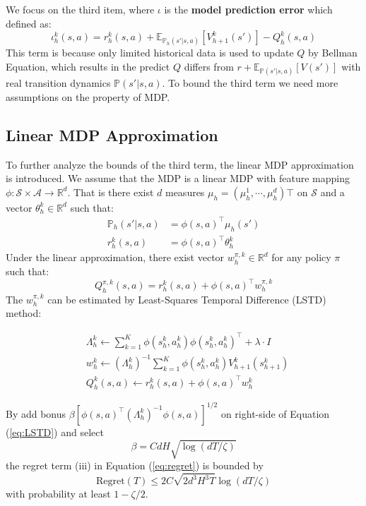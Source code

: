 We focus on the third item, where $\iota$ is the \textbf{model prediction error} which defined as:
\begin{equation}
\iota_h^k(s,a) = r_h^k(s,a) + \mathbb{E}_{\mathbb{P}_h(s'|s,a)}[V_{h+1}^k(s')] -Q_h^k(s,a)
\end{equation}
This term is because only limited historical data is used to update $Q$ by Bellman Equation, which results in the predict $Q$ differs from $r+\mathbb{E}_{\mathbb{P}(s'|s,a)}[V(s')]$ with real transition dynamics  $\mathbb{P}(s'|s,a)$. To bound the third term we need more assumptions on the property of MDP.

\subsection{Linear MDP Approximation}
To further analyze the bounds of the third term, the linear MDP approximation is introduced. We assume that the MDP is a linear MDP with feature mapping $\phi : \mathcal{S}\times \mathcal{A} \rightarrow \mathbb{R}^d$. That is there exist $d$ measures $\mu_h=(\mu_h^1,\cdots,\mu_h^d)\top$ on $\mathcal{S}$ and a vector $\theta_h^k \in \mathbb{R}^d$ such that:
\begin{align}
    \mathbb{P}_h(s'|s,a)&=\phi(s,a)^\top\mu_h(s')\\
    r_h^k(s,a)&=\phi(s,a)^\top\theta^k_h
\end{align}
Under the linear approximation, there exist vector $w_h^{\pi,k}\in\mathbb{R}^d$ for any policy $\pi$ such that:
\[Q_h^{\pi,k}(s,a) = r_h^k(s,a)+\phi(s,a)^\top w_h^{\pi,k}\]
The $w_h^{\pi,k}$ can be estimated by Least-Squares Temporal Difference (LSTD) method:

\begin{align}
    & \Lambda_h^k \leftarrow \sum_{k=1}^{K}\phi(s_h^k,a_h^k)\phi(s_h^k,a_h^k)^\top+\lambda\cdot I\\
    & w_h^k \leftarrow (\Lambda_h^k)^{-1}\sum_{k=1}^{K}\phi(s_h^k,a_h^k) V^k_{h+1}(s_{h+1}^k)\\
    & Q_h^k(s,a)\leftarrow r_h^k(s,a) + \phi(s,a)^\top w_h^k \label{eq:LSTD}
\end{align}
    
By add bonus $\beta[\phi(s,a)^\top(\Lambda_h^k)^{-1}\phi(s,a)]^{1/2}$ on right-side of Equation (\ref{eq:LSTD}) and select 
\[\beta=CdH\sqrt{\log(dT/\zeta)}\]
the regret term (iii)  in Equation (\ref{eq:regret}) is bounded by 
\[\text{Regret}(T) \leq 2C\sqrt{2d^3H^3T}\log(dT/\zeta)\]
with probability at least $1-\zeta/2$.

